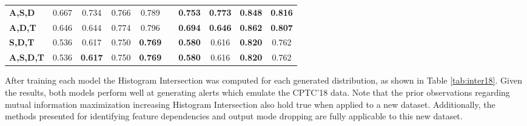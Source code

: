 \begin{table}[!htbp]
\begin{adjustbox}{angle=90}
\begin{tabular}{l|c|c|c|c|c|c|c|c|c|}
			\textbf{A,S,D} & 0.667 & 0.734 & 0.766 & 0.789 &  & \textbf{0.753} & \textbf{0.773} & \textbf{0.848} & \textbf{0.816} \\
			\textbf{A,D,T} & 0.646 & 0.644 & 0.774 & 0.796 &  & \textbf{0.694} & \textbf{0.646} & \textbf{0.862} & \textbf{0.807} \\
			\textbf{S,D,T} & 0.536 & 0.617 & 0.750 & \textbf{0.769} &  & \textbf{0.580} & 0.616 & \textbf{0.820} & 0.762 \\ \hline
			\textbf{A,S,D,T} & 0.536 & \textbf{0.617} & 0.750 & \textbf{0.769} &  & \textbf{0.580} & 0.616 & \textbf{0.820} & 0.762
		\end{tabular}
	\end{adjustbox}
\end{table}


After training each model the Histogram Intersection was computed for each generated distribution, as shown in Table \ref{tab:inter18}. Given the results, both models perform well at generating alerts which emulate the CPTC'18 data. Note that the prior observations regarding mutual information maximization increasing Histogram Intersection also hold true when applied to a new dataset. Additionally, the methods presented for identifying feature dependencies and output mode dropping are fully applicable to this new dataset.
